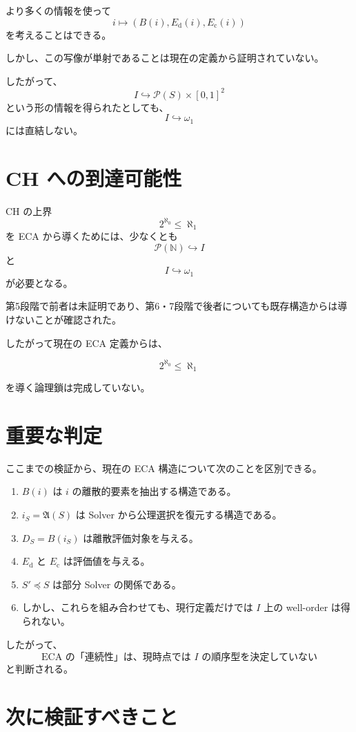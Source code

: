 \documentclass[a4paper,11pt]{article}
\begin{document}
より多くの情報を使って
\[
i
\longmapsto
\left(
B(i),
E_{\mathrm{d}}(i),
E_{\mathrm{c}}(i)
\right)
\]
を考えることはできる。

しかし、この写像が単射であることは現在の定義から証明されていない。

したがって、
\[
I
\hookrightarrow
\mathcal{P}(S)\times[0,1]^2
\]
という形の情報を得られたとしても、
\[
I\hookrightarrow\omega_1
\]
には直結しない。

\section{CH への到達可能性}

CH の上界
\[
2^{\aleph_0}\leq\aleph_1
\]
を ECA から導くためには、少なくとも
\[
\mathcal{P}(\mathbb{N})\hookrightarrow I
\]
と
\[
I\hookrightarrow\omega_1
\]
が必要となる。

第5段階で前者は未証明であり、第6・7段階で後者についても既存構造からは導けないことが確認された。

したがって現在の ECA 定義からは、

\[
\boxed{
2^{\aleph_0}\leq\aleph_1
}
\]

を導く論理鎖は完成していない。

\section{重要な判定}

ここまでの検証から、現在の ECA 構造について次のことを区別できる。

\begin{enumerate}[label=(\arabic*)]
\item $B(i)$ は $i$ の離散的要素を抽出する構造である。
\item $i_S=\mathfrak A(S)$ は Solver から公理選択を復元する構造である。
\item $D_S=B(i_S)$ は離散評価対象を与える。
\item $E_{\mathrm{d}}$ と $E_{\mathrm{c}}$ は評価値を与える。
\item $S'\preceq S$ は部分 Solver の関係である。
\item しかし、これらを組み合わせても、現行定義だけでは $I$ 上の well-order は得られない。
\end{enumerate}

したがって、
\[
\boxed{
\text{ECA の「連続性」は、現時点では }I\text{ の順序型を決定していない}
}
\]
と判断される。

\section{次に検証すべきこと}
\end{document}
